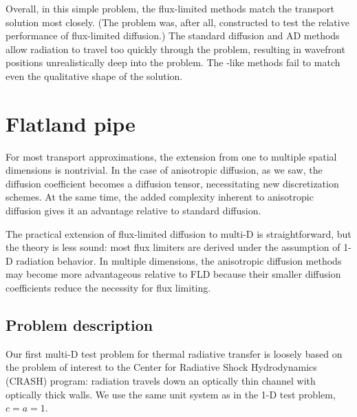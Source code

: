 
Overall, in this simple problem, the flux-limited methods match the transport
solution most closely. (The problem was, after all, constructed to test the
relative performance of flux-limited diffusion.) The standard diffusion
and AD methods allow radiation to travel too quickly through the problem,
resulting in wavefront positions unrealistically deep into the problem. The
\Pone-like methods fail to match even the qualitative shape of the solution.

\section{Flatland pipe}

For most transport approximations, the extension from one to multiple spatial
dimensions is nontrivial. In the case of anisotropic diffusion, as we saw, the
diffusion coefficient becomes a diffusion tensor, necessitating new
discretization schemes. At the same time, the added complexity inherent
to anisotropic
diffusion gives it an advantage relative to standard diffusion.

The practical extension of flux-limited diffusion to multi-D is straightforward,
but the theory is less sound: most flux limiters are derived under
the assumption of 1-D radiation behavior. In multiple dimensions, the
anisotropic diffusion methods may become more advantageous relative to FLD
because their smaller diffusion coefficients reduce the necessity for flux
limiting.

\subsection{Problem description}

Our first multi-D test problem for thermal radiative transfer is loosely based
on the problem of interest to the Center for Radiative Shock Hydrodynamics
(CRASH) program: radiation travels down an optically thin channel with
optically thick walls. We use the same unit system as in the 1-D test problem, $c=a=1$.


